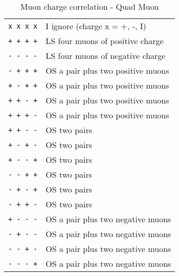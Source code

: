 
\begin{table}[ht]
\caption{Muon charge correlation - Quad Muon}
\vspace{5mm}
\centering
\begin{tabular}{|c|l|}\hline
\verb|x x x x| & I  ignore (charge x = +, -, I) \\
\verb|+ + + +| & LS four muons of positive charge \\
\verb|- - - -| & LS four muons of negative charge \\
\verb|- + + +| & OS a pair plus two positive muons \\
\verb|+ - + +| & OS a pair plus two positive muons \\
\verb|+ + - +| & OS a pair plus two positive muons \\
\verb|+ + + -| & OS a pair plus two positive muons \\
\verb|+ + - -| & OS two pairs \\
\verb|+ - + -| & OS two pairs \\
\verb|+ - - +| & OS two pairs \\
\verb|- - + +| & OS two pairs \\
\verb|- + - +| & OS two pairs \\
\verb|- + + -| & OS two pairs \\
\verb|+ - - -| & OS a pair plus two negative muons \\
\verb|- + - -| & OS a pair plus two negative muons \\
\verb|- - + -| & OS a pair plus two negative muons \\
\verb|- - - +| & OS a pair plus two negative muons \\\hline
\end{tabular}
\label{tab:gtl:muon_charge_corr_quad}
\end{table}

